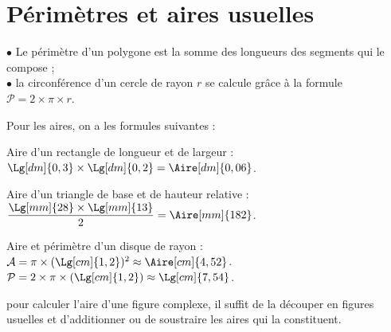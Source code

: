 \section{Périmètres et aires usuelles}

$\bullet$ Le périmètre d'un polygone est la somme des longueurs des segments qui le compose ; \\
$\bullet$ la circonférence d'un cercle de rayon $r$ se calcule grâce à la formule $\mathcal{P} =2\times\pi\times r$. \medskip

Pour les aires, on a les formules suivantes :

\begin{minipage}[t]{5cm}
   \Formule[Aire,Surface=rectangle,Ancre={(2.5,-2)},Couleur=yellow!10]
\end{minipage}
\qquad
\begin{minipage}[t]{5cm}
   \Formule[Aire,Surface=triangle,Ancre={(2.5,-2)},Couleur=yellow!10]
\end{minipage}
\qquad
\begin{minipage}[t]{5cm}
   \Formule[Aire,Surface=disque,Ancre={(2.5,-2)},Couleur=yellow!10]
\end{minipage}

\vspace*{40mm}
\hspace*{-11mm}
\begin{minipage}[t]{5cm}
   \begin{exemple}[1.5]
      Aire d'un rectangle de longueur  et de largeur  : \\ [1mm]
      $\Lg[dm]{0,3}\times\Lg[dm]{0,2} =\Aire[dm]{0,06}$.
   \end{exemple}
\end{minipage}
\qquad
\begin{minipage}[t]{5cm}
   \begin{exemple}[1.5]
      Aire d'un triangle de base  et de hauteur relative  : \\ [2mm]
   $\dfrac{\Lg[mm]{28}\times\Lg[mm]{13}}{2} =\Aire[mm]{182}$.
   \end{exemple}
\end{minipage}
\qquad
\begin{minipage}[t]{5cm}
   \begin{exemple}[1.5]
      Aire et périmètre d'un disque de rayon  : \\
      $\mathcal{A} =\pi\times(\Lg[cm]{1,2})^2\approx\Aire[cm]{4,52}$. \\
      $\mathcal{P} =2\times\pi\times(\Lg[cm]{1,2})\approx\Lg[cm]{7,54}$.
   \end{exemple}
\end{minipage}

\begin{remarque}
   pour calculer l'aire d'une figure complexe, il suffit de la \og découper \fg{} en figures usuelles et d'additionner ou de soustraire les aires qui la constituent.
\end{remarque}
